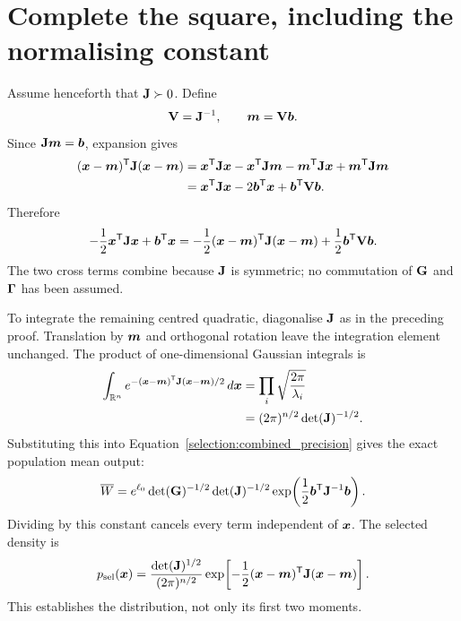 \section{Complete the square, including the normalising constant}
\label{selection:complete_square}

Assume henceforth that $\mathbf{J}\succ0$. Define
\begin{equation}
\mathbf{V}=\mathbf{J}^{-1},
\qquad \boldsymbol{m}=\mathbf{V}\boldsymbol{b}.
\end{equation}
Since $\mathbf{J}\boldsymbol{m}=\boldsymbol{b}$, expansion gives
\begin{align}
(\boldsymbol{x}-\boldsymbol{m})^{\mathsf T}\mathbf{J}(\boldsymbol{x}-\boldsymbol{m})
 &=\boldsymbol{x}^{\mathsf T}\mathbf{J}\boldsymbol{x}
   -\boldsymbol{x}^{\mathsf T}\mathbf{J}\boldsymbol{m}
   -\boldsymbol{m}^{\mathsf T}\mathbf{J}\boldsymbol{x}
   +\boldsymbol{m}^{\mathsf T}\mathbf{J}\boldsymbol{m}\nonumber\\
 &=\boldsymbol{x}^{\mathsf T}\mathbf{J}\boldsymbol{x}
   -2\boldsymbol{b}^{\mathsf T}\boldsymbol{x}
   +\boldsymbol{b}^{\mathsf T}\mathbf{V}\boldsymbol{b}.
\end{align}
Therefore
\begin{equation}
-\frac12\boldsymbol{x}^{\mathsf T}\mathbf{J}\boldsymbol{x}+\boldsymbol{b}^{\mathsf T}\boldsymbol{x}
 =-\frac12(\boldsymbol{x}-\boldsymbol{m})^{\mathsf T}\mathbf{J}(\boldsymbol{x}-\boldsymbol{m})
   +\frac12\boldsymbol{b}^{\mathsf T}\mathbf{V}\boldsymbol{b}.
\label{selection:completed_square}
\end{equation}
The two cross terms combine because $\mathbf{J}$ is symmetric; no commutation
of $\mathbf{G}$ and $\boldsymbol{\Gamma}$ has been assumed.

To integrate the remaining centred quadratic, diagonalise $\mathbf{J}$ as
in the preceding proof. Translation by $\boldsymbol{m}$ and orthogonal rotation
leave the integration element unchanged. The product of one-dimensional
Gaussian integrals is
\begin{align}
\int_{\mathbb R^n}
 e^{-(\boldsymbol{x}-\boldsymbol{m})^{\mathsf T}\mathbf{J}(\boldsymbol{x}-\boldsymbol{m})/2}
 \,d\boldsymbol{x}
 &=\prod_i\sqrt{\frac{2\pi}{\lambda_i}}\nonumber\\
 &=(2\pi)^{n/2}\det(\mathbf{J})^{-1/2}.
\end{align}
Substituting this into Equation~\eqref{selection:combined_precision}
gives the exact population mean output:
\begin{equation}
\overline W
 =e^{\ell_0}\det(\mathbf{G})^{-1/2}\det(\mathbf{J})^{-1/2}
      \exp\!\left(\frac12\boldsymbol{b}^{\mathsf T}\mathbf{J}^{-1}\boldsymbol{b}\right).
\label{selection:normaliser}
\end{equation}
Dividing by this constant cancels every term independent of $\boldsymbol{x}$.
The selected density is
\begin{equation}
p_{\mathrm{sel}}(\boldsymbol{x})
 =\frac{\det(\mathbf{J})^{1/2}}{(2\pi)^{n/2}}
   \exp\!\left[-\frac12(\boldsymbol{x}-\boldsymbol{m})^{\mathsf T}
                       \mathbf{J}(\boldsymbol{x}-\boldsymbol{m})\right].
\label{selection:normalised_density}
\end{equation}
This establishes the distribution, not only its first two moments.

